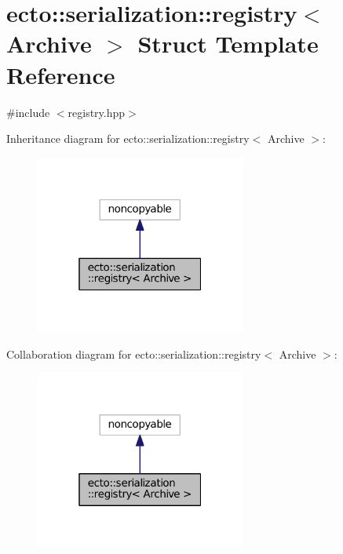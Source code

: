 \hypertarget{structecto_1_1serialization_1_1registry}{}\section{ecto\+:\+:serialization\+:\+:registry$<$ Archive $>$ Struct Template Reference}
\label{structecto_1_1serialization_1_1registry}


{\ttfamily \#include $<$registry.\+hpp$>$}



Inheritance diagram for ecto\+:\+:serialization\+:\+:registry$<$ Archive $>$\+:\nopagebreak
\begin{figure}[H]
\begin{center}
\leavevmode
\includegraphics[width=196pt]{structecto_1_1serialization_1_1registry__inherit__graph}
\end{center}
\end{figure}


Collaboration diagram for ecto\+:\+:serialization\+:\+:registry$<$ Archive $>$\+:\nopagebreak
\begin{figure}[H]
\begin{center}
\leavevmode
\includegraphics[width=196pt]{structecto_1_1serialization_1_1registry__coll__graph}
\end{center}
\end{figure}

